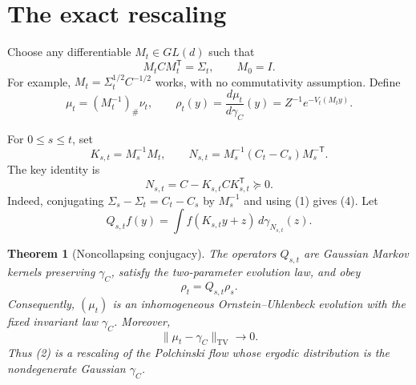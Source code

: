 \documentclass[11pt]{article}
\newtheorem{theorem}{Theorem}
\newcommand{\TV}{\mathrm{TV}}
\begin{document}
\section*{The exact rescaling}

Choose any differentiable $M_t\in GL(d)$ such that
\begin{equation*}
                 M_t C M_t^{\mathsf T}=\Sigma_t,\qquad M_0=I.       \tag{1}
\end{equation*}
For example,
$M_t=\Sigma_t^{1/2}C^{-1/2}$ works, with no commutativity assumption.
Define
\begin{equation*}
 \mu_t=(M_t^{-1})_\#\nu_t,\qquad
 \rho_t(y)=\frac{d\mu_t}{d\gamma_C}(y)
   =Z^{-1}e^{-V_t(M_ty)}.                                          \tag{2}
\end{equation*}

For $0\le s\le t$, set
\begin{equation*}
 K_{s,t}=M_s^{-1}M_t,\qquad
 N_{s,t}=M_s^{-1}(C_t-C_s)M_s^{-\mathsf T}.                         \tag{3}
\end{equation*}
The key identity is
\begin{equation*}
 N_{s,t}=C-K_{s,t}CK_{s,t}^{\mathsf T}\succeq0.                    \tag{4}
\end{equation*}
Indeed, conjugating
$\Sigma_s-\Sigma_t=C_t-C_s$ by $M_s^{-1}$ and using (1) gives (4).
Let
\begin{equation*}
 Q_{s,t}f(y)=\int f(K_{s,t}y+z)\,d\gamma_{N_{s,t}}(z).              \tag{5}
\end{equation*}

\begin{theorem}[Noncollapsing conjugacy]\label{thm:main}
The operators $Q_{s,t}$ are Gaussian Markov kernels preserving
$\gamma_C$, satisfy the two-parameter evolution law, and obey
\begin{equation*}
                         \rho_t=Q_{s,t}\rho_s.                     \tag{6}
\end{equation*}
Consequently, $(\mu_t)$ is an inhomogeneous Ornstein--Uhlenbeck evolution
with the fixed invariant law $\gamma_C$.  Moreover,
\begin{equation*}
                     \|\mu_t-\gamma_C\|_{\TV}\longrightarrow0.    \tag{7}
\end{equation*}
Thus (2) is a rescaling of the Polchinski flow whose ergodic distribution is
the nondegenerate Gaussian $\gamma_C$.
\end{theorem}
\end{document}

